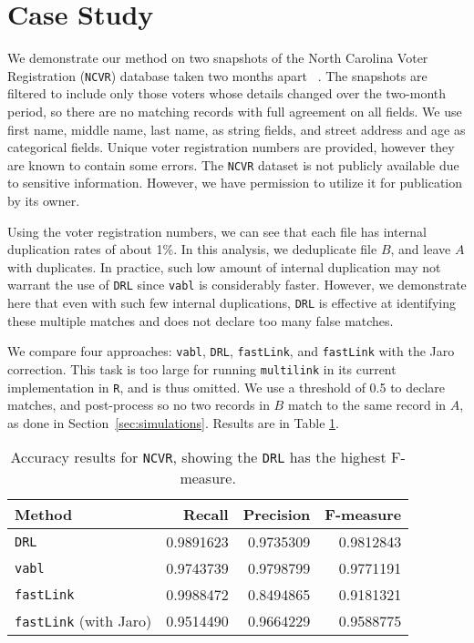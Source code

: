 \documentclass[12pt,letterpaper]{article}
\newcommand{\1}[1]{\mathbb{I}\!\left[#1\right]} %
\begin{document}
\section{Case Study}\label{sec:case-study}

We demonstrate our method on two snapshots of the North Carolina Voter Registration (\texttt{NCVR}) database taken two months apart ~\citep{christen_preparation_2014}. The snapshots are filtered to include only those voters whose details changed over the two-month period, so there are no matching records with full agreement on all fields. We use first name, middle name, last name, as string fields, and street address and age as categorical fields. Unique voter registration numbers are provided, however they are known to contain some errors. The \texttt{NCVR} dataset is not publicly available due to sensitive information. However, we have permission to utilize it for publication by its owner.

Using the voter registration numbers, we can see that each file has internal duplication rates of about 1\%. In this analysis, we deduplicate file $B$, and leave $A$ with duplicates. In practice, such low amount of internal duplication may not warrant the use of \texttt{DRL} since \texttt{vabl} is considerably faster. However, we demonstrate here that even with such few internal duplications, \texttt{DRL} is effective at identifying these multiple matches and does not declare too many false matches. 

We compare four approaches: \texttt{vabl}, \texttt{DRL}, \texttt{fastLink}, and \texttt{fastLink} with the Jaro correction. This task is too large for running \texttt{multilink} in its current implementation in \texttt{R}, and is thus omitted. We use a threshold of 0.5 to declare matches, and post-process so no two records in $B$ match to the same record in $A$, as done in Section~\ref{sec:simulations}. Results are in Table \ref{table:ncvr_results}.

\begin{table}[t]
	\centering
	\begin{tabular}{l|rrr}
		Method & Recall & Precision & F-measure\\
		\hline
		\texttt{DRL} & 0.9891623 & 0.9735309 & 0.9812843\\
		\hline
		\texttt{vabl} & 0.9743739 & 0.9798799 & 0.9771191\\
		\hline
		\texttt{fastLink} & 0.9988472 & 0.8494865 & 0.9181321\\
		\hline
		\texttt{fastLink} (with Jaro) & 0.9514490 & 0.9664229 & 0.9588775\\
	\end{tabular}
	\caption{Accuracy results for \texttt{NCVR}, showing the \texttt{DRL} has the highest F-measure.}
	\label{table:ncvr_results}
\end{table}
\end{document}

